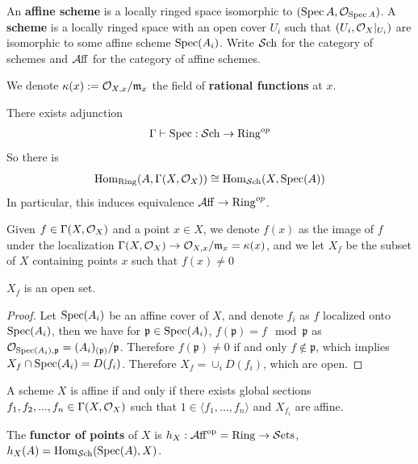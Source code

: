 \begin{definition}
    An \textbf{affine scheme} is a locally ringed space isomorphic to $(\operatorname{\mathrm{Spec}} A,\mathcal{O}_{\operatorname{\mathrm{Spec}} A})$. A \textbf{scheme} is a locally ringed space with an open cover $U_i$ such that $(U_i,\mathcal{O}_X|_{U_i})$ are isomorphic to some affine scheme $\operatorname{\mathrm{Spec}}(A_i)$.
Write $\mathcal{S}\mathrm{ch}$ for the category of schemes and $\operatorname{\mathcal{A}ff}$ for the category of affine schemes.
\end{definition}

We denote $\kappa(x):=\mathcal{O}_{X,x}/\mathfrak{m}_x$ the field of \textbf{rational functions} at $x$.

\begin{theorem}
    \cite{AGHartshorne}\cite{AGVakil}
There exists adjunction
\begin{align*}
    \Gamma\vdash\operatorname{\mathrm{Spec}}: \mathcal{S}\mathrm{ch}\to \mathrm{Ring}^{op}
\end{align*}So there is
\[
    \operatorname{Hom}_{\mathrm{Ring}}(A,\Gamma(X,\mathcal{O}_X) )\cong \operatorname{Hom}_{\mathcal{S}\mathrm{ch}}(X, \operatorname{\mathrm{Spec}} (A))
\]
In particular, this induces equivalence $\operatorname{\mathcal{A}ff}\to \mathrm{Ring}^{op}$.
\end{theorem}

Given $f\in \Gamma(X,\mathcal{O}_X)$ and a point $x\in X$, we denote $f(x)$ as the image of $f$ under the localization $ \Gamma(X,\mathcal{O}_X)\to \mathcal{O}_{X,x}/\mathfrak{m}_x=\kappa(x)$, and we let $X_f$ be the subset of $X$ containing points $x$ such that $f(x)\neq 0$

\begin{lemma}
    $X_f$ is an open set.
\end{lemma}
\begin{proof}
Let $\operatorname{\mathrm{Spec}}(A_i)$ be an affine cover of $X$, and denote $f_i$ as $f$ localized onto $\operatorname{\mathrm{Spec}}(A_i)$, then we have for $\mathfrak{p}\in \operatorname{\mathrm{Spec}}(A_i)$, $f(\mathfrak{p})=f \mod \mathfrak{p}$ as $\mathcal{O}_{\operatorname{\mathrm{Spec}}(A_i), \mathfrak{p}}=(A_i)_{(\mathfrak{p})}/\mathfrak{p}$. Therefore $f(\mathfrak{p})\neq 0$ if and only $f\notin \mathfrak{p}$, which implies $X_f\cap \operatorname{\mathrm{Spec}}(A_i)=D(f_i)$. Therefore $X_f=\cup_i D(f_i)$, which are open.
\end{proof}

\begin{theorem}
    \cite{AGHartshorne}\cite{AGVakil}
    A scheme $X$ is affine if and only if there exists global sections $f_1,f_2,...,f_n\in \Gamma(X,\mathcal{O}_X)$ such that $1\in \langle f_1,...,f_n\rangle$ and $X_{f_i}$ are affine.
\end{theorem}

\begin{definition}\cite{AGGoerss}
The \textbf{functor of points} of $X$ is
$h_X:\operatorname{\mathcal{A}ff}^{\mathrm{op}}=\mathrm{Ring}\to \operatorname{\mathcal{S}ets}$, $h_X(A)=\operatorname{Hom}_{\mathcal{S}\mathrm{ch}}(\operatorname{\mathrm{Spec}}(A),X)$.
\end{definition}

